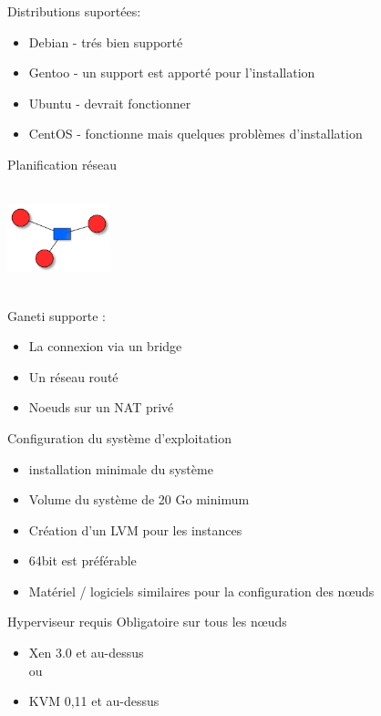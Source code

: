 \begin{frame}
Distributions suportées:\\
\begin{itemize}
\item Debian - trés bien supporté
\item Gentoo - un support est apporté pour l'installation
\item Ubuntu - devrait fonctionner
\item CentOS - fonctionne mais quelques problèmes d'installation
\end{itemize}
\end{frame}

\begin{frame}{Planification réseau}
\begin{center}
  \includegraphics[width=3cm,height=3cm]{images_presentation/network.png}
\end{center}
\begin{block}{Ganeti supporte :}
\begin{itemize}
\item La connexion via un bridge
\item Un réseau routé
\item Noeuds sur un NAT privé
\end{itemize}
\end{block}
\end{frame}

\begin{frame}{Configuration du système d'exploitation}
\begin{itemize}
\item installation minimale du système
\pause
\item Volume du système de 20 Go minimum
\pause
\item Création d'un LVM pour les instances
\pause
\item 64bit est préférable
\pause
\item Matériel / logiciels similaires pour la configuration des nœuds
\end{itemize}
\end{frame}

\begin{frame}{Hyperviseur requis}
Obligatoire sur tous les nœuds
\begin{itemize}
\item Xen 3.0 et au-dessus \\ou
\item KVM 0,11 et au-dessus
\end{itemize}
\end{frame}

